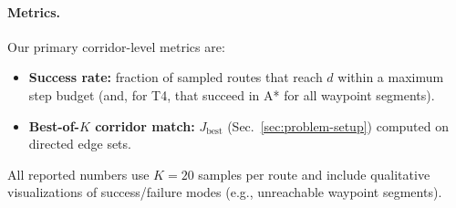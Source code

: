 \paragraph{Metrics.}
Our primary corridor-level metrics are:
\begin{itemize}
  \item \textbf{Success rate:} fraction of sampled routes that reach $d$ within a maximum step budget (and, for T4, that succeed in A* for all waypoint segments).
  \item \textbf{Best-of-$K$ corridor match:} $J_{\mathrm{best}}$ (Sec.~\ref{sec:problem-setup}) computed on directed edge sets.
\end{itemize}
All reported numbers use $K=20$ samples per route and include qualitative visualizations of success/failure modes (e.g., unreachable waypoint segments).
